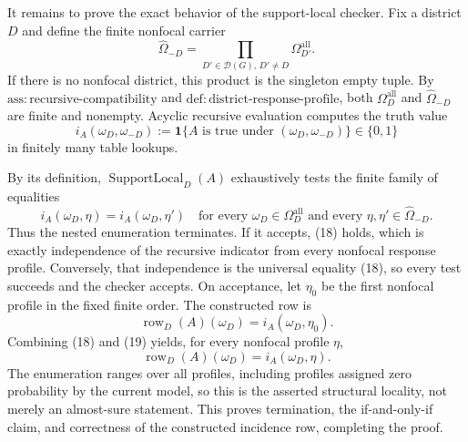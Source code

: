 It remains to prove the exact behavior of the support-local checker.  Fix a
district \(D\) and define the finite nonfocal carrier
\[
 \widehat\Omega_{-D}
 =\prod_{D'\in\mathcal D(G),\,D'\ne D}
   \Omega_{D'}^{\mathrm{all}}.
\]
If there is no nonfocal district, this product is the singleton empty tuple.
By \(\mathrm{ass:recursive\text{-}compatibility}\) and
\(\mathrm{def:district\text{-}response\text{-}profile}\), both
\(\Omega_D^{\mathrm{all}}\) and \(\widehat\Omega_{-D}\) are finite and
nonempty.  Acyclic recursive evaluation computes the truth value
\[
 i_A(\omega_D,\omega_{-D})
 :=\mathbf 1\{A\text{ is true under }(\omega_D,\omega_{-D})\}
 \in\{0,1\}
 \tag{17}
\]
in finitely many table lookups.

By its definition, \(\operatorname{SupportLocal}_D(A)\) exhaustively tests
the finite family of equalities
\[
 i_A(\omega_D,\eta)=i_A(\omega_D,\eta')
 \quad\text{for every }\omega_D\in\Omega_D^{\mathrm{all}}
 \text{ and every }\eta,\eta'\in\widehat\Omega_{-D}.
 \tag{18}
\]
Thus the nested enumeration terminates.  If it accepts, (18) holds, which is
exactly independence of the recursive indicator from every nonfocal response
profile.  Conversely, that independence is the universal equality (18), so
every test succeeds and the checker accepts.  On acceptance, let \(\eta_0\)
be the first nonfocal profile in the fixed finite order.  The constructed row
is
\[
 \operatorname{row}_D(A)(\omega_D)
 =i_A(\omega_D,\eta_0).
 \tag{19}
\]
Combining (18) and (19) yields, for every nonfocal profile \(\eta\),
\[
 \operatorname{row}_D(A)(\omega_D)
 =i_A(\omega_D,\eta).
\]
The enumeration ranges over all profiles, including profiles assigned zero
probability by the current model, so this is the asserted structural locality,
not merely an almost-sure statement.  This proves termination, the if-and-only-if
claim, and correctness of the constructed incidence row, completing the proof.